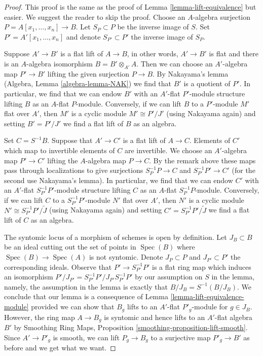 \documentclass{stacks-project}
\theoremstyle{plain}
\theoremstyle{definition}
\theoremstyle{remark}
\numberwithin{equation}{subsection}
\def\Spec{\mathop{\mathrm{Spec}}}
\begin{document}
\begin{proof}
This proof is the same as the proof of
Lemma \ref{lemma-lift-equivalence} but easier. We suggest the
reader to skip the proof.
Choose an $A$-algebra surjection $P = A[x_1, \ldots, x_n] \to B$.
Let $S_P \subset P$ be the inverse image of $S$.
Set $P' = A'[x_1, \ldots, x_n]$ and denote $S_{P'} \subset P'$
the inverse image of $S_P$.

\medskip\noindent
Suppose $A' \to B'$ is a flat lift of $A \to B$, in other words,
$A' \to B'$ is flat and there is an $A$-algebra isomorphism
$B = B' \otimes_{A'} A$. Then we can choose an $A'$-algebra map
$P' \to B'$ lifting the given surjection $P \to B$.
By Nakayama's lemma (Algebra, Lemma \ref{algebra-lemma-NAK})
we find that $B'$ is a quotient of $P'$. In particular, we find
that we can endow $B'$ with an $A'$-flat $P'$-module structure
lifting $B$ as an $A$-flat $P$-module.
Conversely, if we can lift $B$ to a $P'$-module $M'$ flat over $A'$,
then $M'$ is a cyclic module $M' \cong P'/J'$ (using Nakayama again)
and setting $B' = P'/J'$ we find a flat lift of $B$ as an algebra.

\medskip\noindent
Set $C = S^{-1}B$. Suppose that $A' \to C'$ is a flat lift of $A \to C$.
Elements of $C'$ which map to invertible elements of $C$ are invertible.
We choose an $A'$-algebra map $P' \to C'$ lifting
the $A$-algebra map $P \to C$. By the remark above
these maps pass through localizations to give surjections
$S_P^{-1}P \to C$ and $S_{P'}^{-1}P' \to C'$
(for the second use Nakayama's lemma).
In particular, we find that we can endow $C'$ with an $A'$-flat
$S_{P'}^{-1}P'$-module structure lifting $C$ as an $A$-flat
$S_P^{-1}P$-module. Conversely, if we can lift $C$ to a
$S_{P'}^{-1}P'$-module $N'$ flat over $A'$, then $N'$
is a cyclic module $N' \cong S_{P'}^{-1}P'/\tilde J$
(using Nakayama again) and setting $C' = S_{P'}^{-1}P'/\tilde J$
we find a flat lift of $C$ as an algebra.

\medskip\noindent
The syntomic locus of a morphism of schemes is open by definition.
Let $J_B \subset B$ be an ideal cutting out the set of points
in $\Spec(B)$ where $\Spec(B) \to \Spec(A)$ is not syntomic.
Denote $J_P \subset P$ and $J_{P'} \subset P'$ the corresponding
ideals. Observe that $P' \to S_{P'}^{-1}P'$ is a flat ring map which
induces an isomorphism $P'/J_{P'} = S_{P'}^{-1}P'/J_{P'}S_{P'}^{-1}P'$
by our assumption on $S$ in the lemma, namely, the assumption
in the lemma is exactly that $B/J_B = S^{-1}(B/J_B)$.
We conclude that our lemma is a consequence of
Lemma \ref{lemma-lift-equivalence-module} provided we can
show that $B_g$ lifts to an $A'$-flat $P'_g$-module for
$g \in J_B$. However, the ring map $A \to B_g$ is syntomic
and hence lifts to an $A'$-flat algebra $B'$ by
Smoothing Ring Maps, Proposition \ref{smoothing-proposition-lift-smooth}.
Since $A' \to P'_g$ is smooth, we can lift $P_g \to B_g$
to a surjective map $P'_g \to B'$ as before and we get what we want.
\end{proof}
\end{document}

